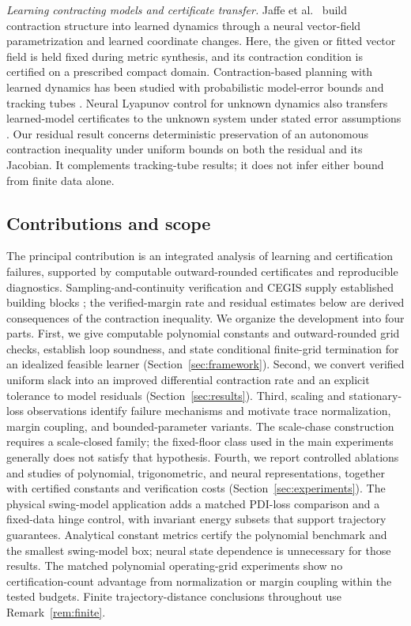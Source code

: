 \documentclass[12pt,onecolumn,journal]{IEEEtran}
\begin{document}
\noindent\textit{Learning contracting models and certificate transfer.} Jaffe et al.\ \cite{jaffe2024} build contraction structure into learned dynamics through a neural vector-field parametrization and learned coordinate changes. Here, the given or fitted vector field is held fixed during metric synthesis, and its contraction condition is certified on a prescribed compact domain. Contraction-based planning with learned dynamics has been studied with probabilistic model-error bounds and tracking tubes \cite{chou2021}. Neural Lyapunov control for unknown dynamics also transfers learned-model certificates to the unknown system under stated error assumptions \cite{zhou2022}. Our residual result concerns deterministic preservation of an autonomous contraction inequality under uniform bounds on both the residual and its Jacobian. It complements tracking-tube results; it does not infer either bound from finite data alone.

\subsection{Contributions and scope}

The principal contribution is an integrated analysis of learning and certification failures, supported by computable outward-rounded certificates and reproducible diagnostics. Sampling-and-continuity verification and CEGIS supply established building blocks \cite{bobiti2018,solar2006}; the verified-margin rate and residual estimates below are derived consequences of the contraction inequality. We organize the development into four parts. First, we give computable polynomial constants and outward-rounded grid checks, establish loop soundness, and state conditional finite-grid termination for an idealized feasible learner (Section~\ref{sec:framework}). Second, we convert verified uniform slack into an improved differential contraction rate and an explicit tolerance to model residuals (Section~\ref{sec:results}). Third, scaling and stationary-loss observations identify failure mechanisms and motivate trace normalization, margin coupling, and bounded-parameter variants. The scale-chase construction requires a scale-closed family; the fixed-floor class used in the main experiments generally does not satisfy that hypothesis. Fourth, we report controlled ablations and studies of polynomial, trigonometric, and neural representations, together with certified constants and verification costs (Section~\ref{sec:experiments}). The physical swing-model application adds a matched PDI-loss comparison and a fixed-data hinge control, with invariant energy subsets that support trajectory guarantees. Analytical constant metrics certify the polynomial benchmark and the smallest swing-model box; neural state dependence is unnecessary for those results. The matched polynomial operating-grid experiments show no certification-count advantage from normalization or margin coupling within the tested budgets. Finite trajectory-distance conclusions throughout use Remark~\ref{rem:finite}.
\end{document}

